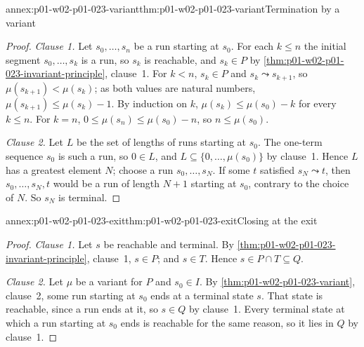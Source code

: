 \begin{annexitem}{annex:p01-w02-p01-023-variant}{thm:p01-w02-p01-023-variant}{Termination by a variant}
\begin{proof}
\emph{Clause 1.} Let \(s_0,\ldots,s_n\) be a run starting at \(s_0\). For
each \(k\leq n\) the initial segment \(s_0,\ldots,s_k\) is a run, so
\(s_k\) is reachable, and \(s_k\in P\) by
\cref{thm:p01-w02-p01-023-invariant-principle}, clause~1. For \(k<n\),
\(s_k\in P\) and \(s_k\leadsto s_{k+1}\), so \(\mu(s_{k+1})<\mu(s_k)\);
as both values are natural numbers, \(\mu(s_{k+1})\leq\mu(s_k)-1\). By
induction on \(k\), \(\mu(s_k)\leq\mu(s_0)-k\) for every \(k\leq n\). For
\(k=n\), \(0\leq\mu(s_n)\leq\mu(s_0)-n\), so \(n\leq\mu(s_0)\).

\emph{Clause 2.} Let \(L\) be the set of lengths of runs starting at
\(s_0\). The one-term sequence \(s_0\) is such a run, so \(0\in L\), and
\(L\subseteq\{0,\ldots,\mu(s_0)\}\) by clause~1. Hence \(L\) has a greatest
element \(N\); choose a run \(s_0,\ldots,s_N\). If some \(t\) satisfied
\(s_N\leadsto t\), then \(s_0,\ldots,s_N,t\) would be a run of length
\(N+1\) starting at \(s_0\), contrary to the choice of \(N\). So \(s_N\) is
terminal.
\end{proof}
\end{annexitem}

\begin{annexitem}{annex:p01-w02-p01-023-exit}{thm:p01-w02-p01-023-exit}{Closing at the exit}
\begin{proof}
\emph{Clause 1.} Let \(s\) be reachable and terminal. By
\cref{thm:p01-w02-p01-023-invariant-principle}, clause~1, \(s\in P\); and
\(s\in T\). Hence \(s\in P\cap T\subseteq Q\).

\emph{Clause 2.} Let \(\mu\) be a variant for \(P\) and \(s_0\in I\). By
\cref{thm:p01-w02-p01-023-variant}, clause~2, some run starting at \(s_0\)
ends at a terminal state \(s\). That state is reachable, since a run ends at
it, so \(s\in Q\) by clause~1. Every terminal state at which a run starting
at \(s_0\) ends is reachable for the same reason, so it lies in \(Q\) by
clause~1.
\end{proof}
\end{annexitem}

